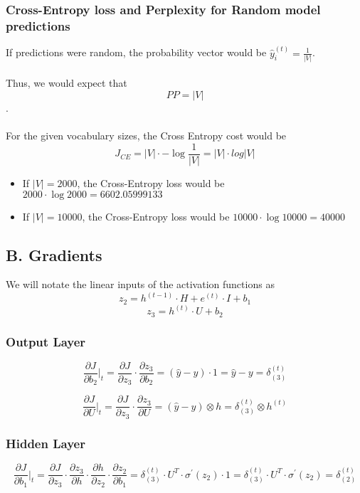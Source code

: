 \documentclass{article}
\begin{document}
\subsubsection*{Cross-Entropy loss and Perplexity for \textbf{Random} model predictions}
If predictions were random, the probability vector would be $\hat y_i^{(t)} = \frac {1} {|V|} $. \\~\\
Thus, we would expect that $$ PP = |V| $$. \\~\\
For the given vocabulary sizes, the Cross Entropy cost would be $$ J_{CE} = |V| \cdot - \log \frac {1} {|V|} = |V| \cdot log |V| $$
\begin{itemize}
\item If $|V| = 2000$, the Cross-Entropy loss would be $ 2000 \cdot \log 2000 = 6602.05999133 $
\item If $|V| = 10000$, the Cross-Entropy loss would be $ 10000 \cdot \log 10000 = 40000 $
\end{itemize}


\subsection*{B. Gradients}
 We will notate the linear inputs of the activation functions as $$ z_2 = h^{(t-1)}\cdot H + e^{(t)}\cdot I+ b_1 $$ $$ z_3 = h^{(t)} \cdot U + b_2$$

\subsubsection*{Output Layer}
$$
	\frac {\partial J}{\partial b_2} \Big|_t = \frac {\partial J}{\partial z_3} \cdot \frac {\partial z_3}{\partial b_2} = (\hat y - y) \cdot 1 = \hat y - y = \delta_{(3)}^{(t)}
$$

$$
	\frac {\partial J}{\partial U} \Big|_t = \frac {\partial J}{\partial z_3} \cdot \frac {\partial z_3}{\partial U} = (\hat y - y) \otimes h = \delta_{(3)}^{(t)} \otimes h^{(t)}
$$

\subsubsection*{Hidden Layer}
$$
	\frac {\partial J}{\partial b_1} \Big|_t= \frac {\partial J}{\partial z_3} \cdot \frac {\partial z_3}{\partial h} \cdot \frac {\partial h}{\partial z_2} \cdot \frac {\partial z_2}{\partial b_1} = \delta_{(3)}^{(t)} \cdot U^{T} \cdot \sigma^{'}(z_2) \cdot 1= \delta_{(3)}^{(t)} \cdot U^{T} \cdot \sigma^{'}(z_2) = \delta_{(2)}^{(t)}
$$
\end{document}
